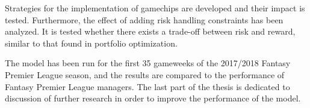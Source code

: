 \newpar 

Strategies for the implementation of gamechips are developed and their impact is tested. Furthermore, the effect of adding risk handling constraints has been analyzed. It is tested whether there exists a trade-off between risk and reward, similar to that found in portfolio optimization.

\newpar

The model has been run for the first 35 gameweeks of the 2017/2018 Fantasy Premier League season, and the results are compared to the performance of Fantasy Premier League managers. The last part of the thesis is dedicated to discussion of further research in order to improve the performance of the model.


  
\clearpage

\begin{comment}
\pagestyle{fancy}
\fancyhf{}
\renewcommand{\chaptermark}[1]{\markboth{\chaptername\ \thechapter.\ #1}{}}
\renewcommand{\sectionmark}[1]{\markright{\thesection\ #1}}
\renewcommand{\headrulewidth}{0.1ex}
\renewcommand{\footrulewidth}{0.1ex}
\fancyfoot[LE,RO]{\thepage}
\fancyhead[LE]{\leftmark}
\fancyhead[RO]{\rightmark}
\fancypagestyle{plain}{\fancyhf{}\fancyfoot[LE,RO]{\thepage}\renewcommand{\headrulewidth}{0ex}}

\pagenumbering{arabic} 				
\setcounter{page}{1}
\end{comment}
